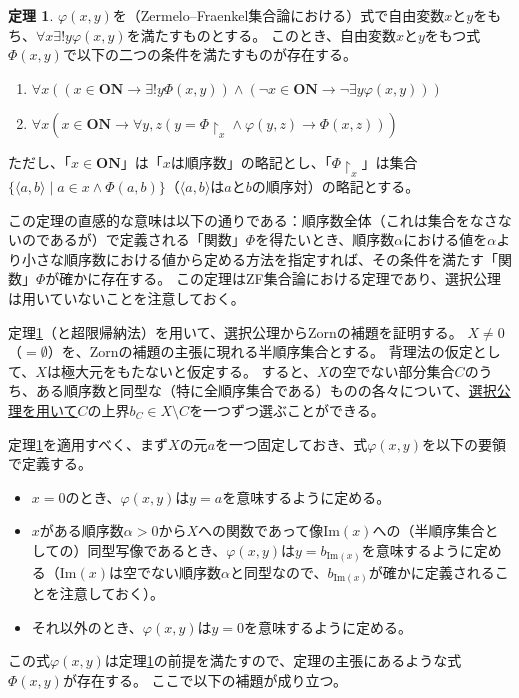 ﻿\documentclass{ltjsarticle}
\theoremstyle{definition}
\newtheorem{theorem}{定理}
\begin{document}
\begin{theorem}
    \label{thm:transfinite_induction}
    $\varphi(x,y)$を（Zermelo--Fraenkel集合論における）式で自由変数$x$と$y$をもち、$\forall x \exists! y \varphi(x,y)$を満たすものとする。
    このとき、自由変数$x$と$y$をもつ式$\Phi(x,y)$で以下の二つの条件を満たすものが存在する。
    \begin{enumerate}
        \item $\forall x ( (x \in \mathbf{ON} \to \exists! y \Phi(x,y)) \land (\neg x \in \mathbf{ON} \to \neg\exists y \varphi(x,y) ) )$
        \item $\forall x ( x \in \mathbf{ON} \to \forall y,z ( y = \Phi\!\upharpoonright_x \land \varphi(y,z) \to \Phi(x,z) ) )$
    \end{enumerate}
    ただし、「$x \in \mathbf{ON}$」は「$x$は順序数」の略記とし、「$\Phi\!\upharpoonright_x$」は集合$\{\langle a,b \rangle \mid a \in x \land \Phi(a,b)\}$（$\langle a,b \rangle$は$a$と$b$の順序対）の略記とする。
\end{theorem}

この定理の直感的な意味は以下の通りである：順序数全体（これは集合をなさないのであるが）で定義される「関数」$\Phi$を得たいとき、順序数$\alpha$における値を$\alpha$より小さな順序数における値から定める方法を指定すれば、その条件を満たす「関数」$\Phi$が確かに存在する。
この定理はZF集合論における定理であり、選択公理は用いていないことを注意しておく。

定理\ref{thm:transfinite_induction}（と超限帰納法）を用いて、選択公理からZornの補題を証明する。
$X \neq 0$（$= \emptyset$）を、Zornの補題の主張に現れる半順序集合とする。
背理法の仮定として、$X$は極大元をもたないと仮定する。
すると、$X$の空でない部分集合$C$のうち、ある順序数と同型な（特に全順序集合である）ものの各々について、\underline{選択公理を用いて}$C$の上界$b_C \in X \setminus C$を一つずつ選ぶことができる。

定理\ref{thm:transfinite_induction}を適用すべく、まず$X$の元$a$を一つ固定しておき、式$\varphi(x,y)$を以下の要領で定義する。
\begin{itemize}
    \item $x = 0$のとき、$\varphi(x,y)$は$y = a$を意味するように定める。
    \item $x$がある順序数$\alpha > 0$から$X$への関数であって像$\mathrm{Im}(x)$への（半順序集合としての）同型写像であるとき、$\varphi(x,y)$は$y = b_{\mathrm{Im}(x)}$を意味するように定める（$\mathrm{Im}(x)$は空でない順序数$\alpha$と同型なので、$b_{\mathrm{Im}(x)}$が確かに定義されることを注意しておく）。
    \item それ以外のとき、$\varphi(x,y)$は$y = 0$を意味するように定める。
\end{itemize}
この式$\varphi(x,y)$は定理\ref{thm:transfinite_induction}の前提を満たすので、定理の主張にあるような式$\Phi(x,y)$が存在する。
ここで以下の補題が成り立つ。
\end{document}
